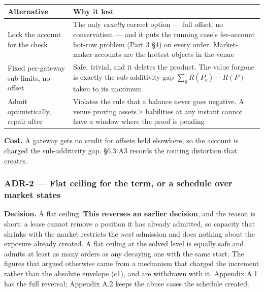 \documentclass[10pt,a4paper]{article}
\newcounter{none}  %
\begin{document}
{\def\LTcaptype{none} %
\begin{longtable}[]{@{}
  >{\raggedright\arraybackslash}p{}
  >{\raggedright\arraybackslash}p{}@{}}
\toprule\noalign{}
\begin{minipage}[b]{\linewidth}\raggedright
Alternative
\end{minipage} & \begin{minipage}[b]{\linewidth}\raggedright
Why it lost
\end{minipage} \\
\midrule\noalign{}
\endhead
\bottomrule\noalign{}
\endlastfoot
Lock the account for the check & The only \emph{exactly} correct option --- full offset, no conservatism --- and it puts the running case's fee-account hot-row problem (Part 3 §4) on every order. Market-maker accounts are the hottest objects in the venue \\
Fixed per-gateway sub-limits, no offset & Safe, trivial, and it deletes the product. The value forgone is exactly the sub-additivity gap \(\sum_g R(P_g)-R(P)\) taken to its maximum \\
Admit optimistically, repair after & Violates the rule that a balance never goes negative. A venue proving assets ≥ liabilities at any instant cannot have a window where the proof is pending \\
\end{longtable}
}

\textbf{Cost.} A gateway gets no credit for offsets held elsewhere, so the account is
charged the sub-additivity gap. §6.3 A3 records the routing distortion that
creates.

\subsubsection{ADR-2 --- Flat ceiling for the term, or a schedule over market states}\label{adr-2-flat-ceiling-for-the-term-or-a-schedule-over-market-states}

\textbf{Decision.} A flat ceiling. \textbf{This reverses an earlier decision}, and the reason is short: a lease cannot
remove a position it has already admitted, so capacity that shrinks with the
market restricts the \emph{next} admission and does nothing about the exposure already
created. A flat ceiling at the solved level is equally safe and admits at least
as many orders as any decaying one with the same start. The figures that argued
otherwise came from a mechanism that charged the increment rather than the
absolute envelope (c1), and are withdrawn with it. Appendix A.1 has the full
reversal; Appendix A.2 keeps the abuse cases the schedule created.
\end{document}
